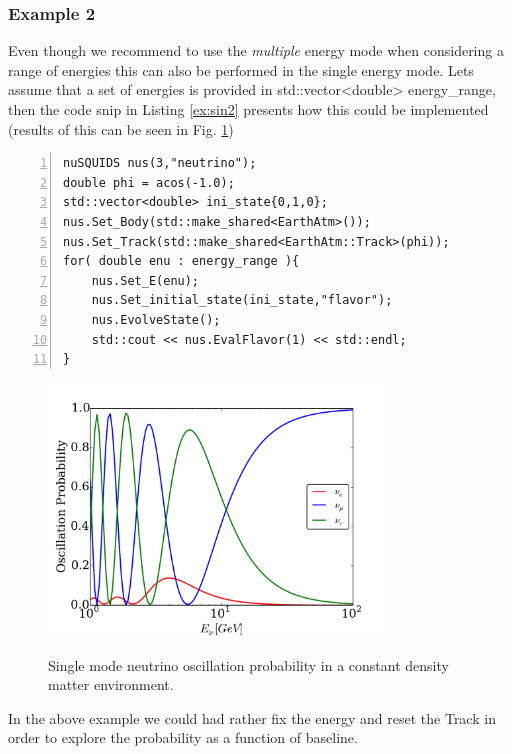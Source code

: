 \documentclass[3p,12pt]{elsarticle}
\newcommand{\ttf}{\ttfamily}
\begin{document}
\subsubsection{Example 2}

Even though we recommend to use the {\it multiple} energy mode when considering a range of energies
this can also be performed in the single energy mode. Lets assume that a set of energies is provided in 
{\ttf std::vector<double> energy\_range}, then the code snip in Listing \ref{ex:sin2} presents how this could be implemented (results of this can be seen in Fig. \ref{fig:atmo_osc})

\begin{lstlisting}[frame=leftline, numbers = left,breaklines=true, label = ex:sin2 ]
nuSQUIDS nus(3,"neutrino");
double phi = acos(-1.0);
std::vector<double> ini_state{0,1,0};
nus.Set_Body(std::make_shared<EarthAtm>());
nus.Set_Track(std::make_shared<EarthAtm::Track>(phi));
for( double enu : energy_range ){
	nus.Set_E(enu);
	nus.Set_initial_state(ini_state,"flavor");
	nus.EvolveState();
	std::cout << nus.EvalFlavor(1) << std::endl;
}
\end{lstlisting}

\begin{figure}[ht]
\begin{center}
\label{fig:atmo_osc}
\includegraphics[width=0.8\textwidth]{./fig/earth_oscillation.pdf}
\caption{Single mode neutrino oscillation probability in a constant density matter environment.}
\end{center}
\end{figure}

In the above example we could had rather fix the energy and reset the {\ttf Track} in order to explore the probability as a function of baseline. 
\end{document}

